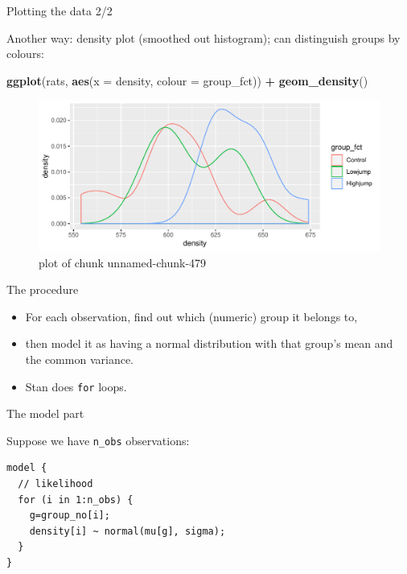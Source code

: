 \documentclass[
  ignorenonframetext,
]{beamer}
\newenvironment{Shaded}{\begin{snugshade}}{\end{snugshade}}
\newcommand{\DataTypeTok}[1]{\textcolor[rgb]{0.13,0.29,0.53}{#1}}
\newcommand{\KeywordTok}[1]{\textcolor[rgb]{0.13,0.29,0.53}{\textbf{#1}}}
\newcommand{\NormalTok}[1]{#1}
\newcommand{\OperatorTok}[1]{\textcolor[rgb]{0.81,0.36,0.00}{\textbf{#1}}}
\newcommand{\StringTok}[1]{\textcolor[rgb]{0.31,0.60,0.02}{#1}}
\providecommand{\tightlist}{%
  \setlength{\itemsep}{0pt}\setlength{\parskip}{0pt}}
\begin{document}
\begin{frame}[fragile]{Plotting the data 2/2}
\protect\hypertarget{plotting-the-data-22}{}

Another way: density plot (smoothed out histogram); can distinguish
groups by colours:

\begin{Shaded}
\begin{Highlighting}[]
\KeywordTok{ggplot}\NormalTok{(rats, }\KeywordTok{aes}\NormalTok{(}\DataTypeTok{x =}\NormalTok{ density, }\DataTypeTok{colour =}\NormalTok{ group_fct)) }\OperatorTok{+}
\StringTok{  }\KeywordTok{geom_density}\NormalTok{()}
\end{Highlighting}
\end{Shaded}

\begin{figure}
\centering
\includegraphics{figure/unnamed-chunk-479-1.pdf}
\caption{plot of chunk unnamed-chunk-479}
\end{figure}

\end{frame}

\begin{frame}[fragile]{The procedure}
\protect\hypertarget{the-procedure}{}

\begin{itemize}
\tightlist
\item
  For each observation, find out which (numeric) group it belongs to,
\item
  then model it as having a normal distribution with that group's mean
  and the common variance.
\item
  Stan does \texttt{for} loops.
\end{itemize}

\end{frame}

\begin{frame}[fragile]{The model part}
\protect\hypertarget{the-model-part}{}

Suppose we have \texttt{n\_obs} observations:

\begin{verbatim}
model {
  // likelihood
  for (i in 1:n_obs) {
    g=group_no[i];
    density[i] ~ normal(mu[g], sigma);
  }
}
\end{verbatim}

\end{frame}
\end{document}

